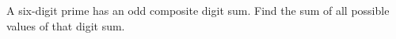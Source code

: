 A six-digit prime has an odd composite digit sum. Find the sum of all possible values of that digit sum.
